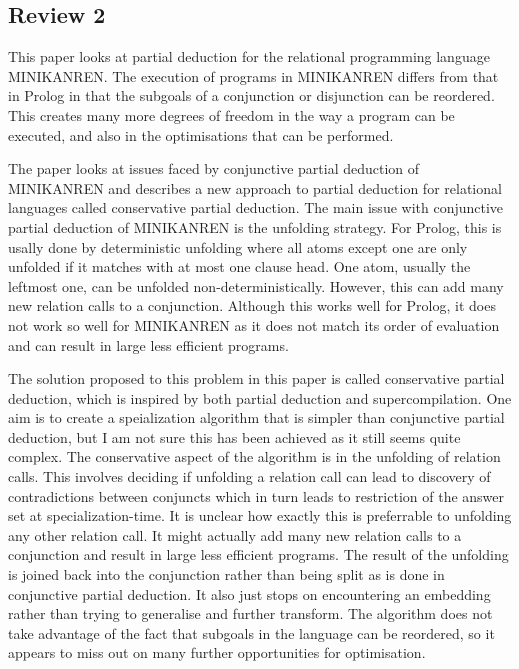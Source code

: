 \subsection*{Review 2}

This paper looks at partial deduction for the relational programming language  MINIKANREN.
The execution of programs in MINIKANREN differs from that in Prolog in that the subgoals
of a conjunction or disjunction can be reordered. This creates many more degrees of freedom
in the way a program can be executed, and also in the optimisations that can be performed.

The paper looks at issues faced by conjunctive partial deduction of MINIKANREN and describes
a new approach to partial deduction for relational languages called conservative partial
deduction. The main issue with conjunctive partial deduction of MINIKANREN is the unfolding
strategy. For Prolog, this is usally done by deterministic unfolding where all atoms except
one are only unfolded if it matches with at most one clause head. One atom, usually the
leftmost one, can be unfolded non-deterministically. However, this can add many new relation
calls to a conjunction. Although this works well for Prolog, it does not work so well for
MINIKANREN as it does not match its order of evaluation and can result in large less efficient
programs.

The solution proposed to this problem in this paper is called conservative partial deduction,
which is inspired by both partial deduction and supercompilation. One aim is to create a
speialization algorithm that is simpler than conjunctive partial deduction, but I am not sure
this has been achieved as it still seems quite complex. The conservative aspect of the algorithm
is in the unfolding of relation calls. This involves deciding if unfolding a relation call can
lead to discovery of contradictions between conjuncts which in turn leads to restriction of the
answer set at specialization-time. It is unclear how exactly this is preferrable to unfolding any
other relation call. It might actually add many new relation calls to a conjunction and result in
large less efficient programs. The result of the unfolding is joined back into the conjunction
rather than being split as is done in conjunctive partial deduction. It also just stops on
encountering an embedding rather than trying to generalise and further transform. The algorithm
does not take advantage of the fact that subgoals in the language can be reordered, so it appears
to miss out on many further opportunities for optimisation.

